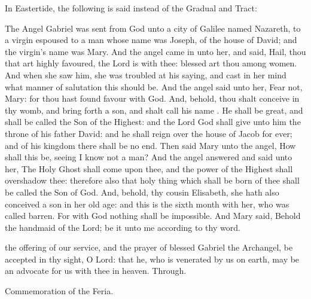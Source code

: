 \begin{rubric}
	In Eastertide, the following is said instead of the Gradual and Tract:
\end{rubric}

 The Angel Gabriel was sent from God unto a city of Galilee named Nazareth, to a virgin espoused to a man whose name was Joseph, of the house of David; and the virgin's name was Mary. And the angel came in unto her, and said, Hail, thou that art highly favoured, the Lord is with thee: blessed art thou among women. And when she saw him, she was troubled at his saying, and cast in her mind what manner of salutation this should be. And the angel said unto her, Fear not, Mary: for thou hast found favour with God. And, behold, thou shalt conceive in thy womb, and bring forth a son, and shalt call his name . He shall be great, and shall be called the Son of the Highest: and the Lord God shall give unto him the throne of his father David: and he shall reign over the house of Jacob for ever; and of his kingdom there shall be no end. Then said Mary unto the angel, How shall this be, seeing I know not a man? And the angel answered and said unto her, The Holy Ghost shall come upon thee, and the power of the Highest shall overshadow thee: therefore also that holy thing which shall be born of thee shall be called the Son of God. And, behold, thy cousin Elisabeth, she hath also conceived a son in her old age: and this is the sixth month with her, who was called barren. For with God nothing shall be impossible. And Mary said, Behold the handmaid of the Lord; be it unto me according to thy word.


\secret
{} the offering of our service, and the prayer of blessed Gabriel the Archangel, be accepted in thy sight, O Lord: that he, who is venerated by us on earth, may be an advocate for us with thee in heaven. Through.
\begin{rubric}
	Commemoration of the Feria.
\end{rubric}


